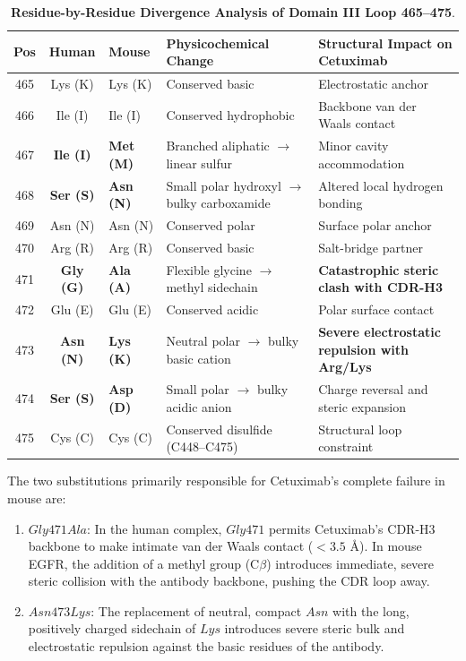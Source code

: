 \documentclass[11pt]{article}
\begin{document}
\begin{table}[htbp]
\centering
\small
\caption{\textbf{Residue-by-Residue Divergence Analysis of Domain III Loop 465--475}.}
\label{tab:loop_divergence_detailed}
\begin{tabularx}{\textwidth}{cclXp{5.5cm}}
\toprule
\textbf{Pos} & \textbf{Human} & \textbf{Mouse} & \textbf{Physicochemical Change} & \textbf{Structural Impact on Cetuximab} \\
\midrule
465 & Lys (K) & Lys (K) & Conserved basic & Electrostatic anchor \\
466 & Ile (I) & Ile (I) & Conserved hydrophobic & Backbone van der Waals contact \\
467 & \textbf{Ile (I)} & \textbf{Met (M)} & Branched aliphatic $\to$ linear sulfur & Minor cavity accommodation \\
468 & \textbf{Ser (S)} & \textbf{Asn (N)} & Small polar hydroxyl $\to$ bulky carboxamide & Altered local hydrogen bonding \\
469 & Asn (N) & Asn (N) & Conserved polar & Surface polar anchor \\
470 & Arg (R) & Arg (R) & Conserved basic & Salt-bridge partner \\
471 & \textbf{Gly (G)} & \textbf{Ala (A)} & Flexible glycine $\to$ methyl sidechain & \textbf{Catastrophic steric clash with CDR-H3} \\
472 & Glu (E) & Glu (E) & Conserved acidic & Polar surface contact \\
473 & \textbf{Asn (N)} & \textbf{Lys (K)} & Neutral polar $\to$ bulky basic cation & \textbf{Severe electrostatic repulsion with Arg/Lys} \\
474 & \textbf{Ser (S)} & \textbf{Asp (D)} & Small polar $\to$ bulky acidic anion & Charge reversal and steric expansion \\
475 & Cys (C) & Cys (C) & Conserved disulfide (C448--C475) & Structural loop constraint \\
\bottomrule
\end{tabularx}
\end{table}

The two substitutions primarily responsible for Cetuximab's complete failure in mouse are:
\begin{enumerate}
    \item \textbf{$Gly471Ala$}: In the human complex, $Gly471$ permits Cetuximab's CDR-H3 backbone to make intimate van der Waals contact ($<3.5\text{ \AA}$). In mouse EGFR, the addition of a methyl group ($\text{C}\beta$) introduces immediate, severe steric collision with the antibody backbone, pushing the CDR loop away.
    \item \textbf{$Asn473Lys$}: The replacement of neutral, compact $Asn$ with the long, positively charged sidechain of $Lys$ introduces severe steric bulk and electrostatic repulsion against the basic residues of the antibody.
\end{enumerate}
\end{document}
